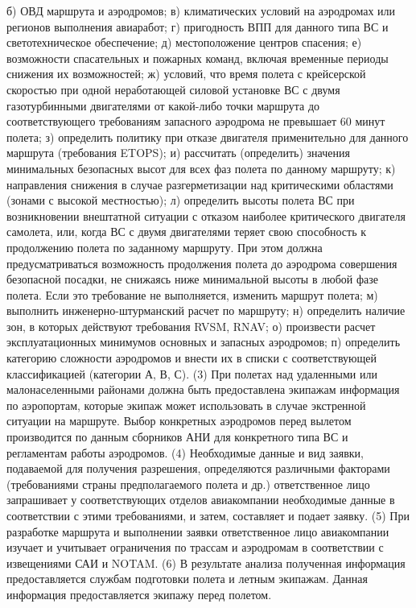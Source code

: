 б)	ОВД маршрута и аэродромов;
в)	климатических условий на аэродромах или регионов выполнения авиаработ;
г)	пригодность ВПП для данного типа ВС и светотехническое обеспечение;
д)	местоположение центров спасения;
е)	возможности спасательных и пожарных команд, включая временные периоды снижения их возможностей; 
ж)	условий, что время полета с крейсерской скоростью при одной неработающей силовой установке ВС с двумя газотурбинными двигателями от какой-либо точки маршрута до соответствующего требованиям запасного аэродрома не превышает 60 минут полета;
з)	определить политику при отказе двигателя применительно для данного маршрута (требования ETOPS); 
и)	рассчитать (определить) значения минимальных безопасных высот для всех фаз полета по данному маршруту;
к)	направления снижения в случае разгерметизации над критическими областями (зонами с высокой местностью);
л)	определить высоты полета ВС при возникновении внештатной ситуации с отказом наиболее критического двигателя самолета, или, когда ВС с двумя двигателями теряет свою способность к продолжению полета по заданному маршруту. При этом должна предусматриваться возможность продолжения полета до аэродрома совершения безопасной посадки, не снижаясь ниже минимальной высоты в любой фазе полета. Если это требование не выполняется, изменить маршрут полета;
м)	выполнить инженерно-штурманский расчет по маршруту;
н)	определить наличие зон, в которых действуют требования RVSM, RNAV;
о)	произвести расчет эксплуатационных минимумов основных и запасных аэродромов;
п)	определить категорию сложности аэродромов и внести их в списки с соответствующей классификацией (категории А, В, С). 
(3) При полетах над удаленными или малонаселенными районами должна быть предоставлена экипажам информация по аэропортам, которые экипаж может использовать в случае экстренной ситуации на маршруте. Выбор конкретных аэродромов перед вылетом производится по данным сборников АНИ для конкретного типа ВС и регламентам работы аэродромов. 
(4) Необходимые данные и вид заявки, подаваемой для получения разрешения, определяются различными факторами (требованиями страны предполагаемого полета и др.) ответственное лицо запрашивает у соответствующих отделов авиакомпании необходимые данные в соответствии с этими требованиями, и затем, составляет и подает заявку.
(5) При разработке маршрута и выполнении заявки ответственное лицо авиакомпании изучает и учитывает ограничения по трассам и аэродромам в соответствии с извещениями САИ и NOTAM.
(6) В результате анализа полученная информация предоставляется службам подготовки полета и летным экипажам. Данная информация предоставляется экипажу перед полетом.
